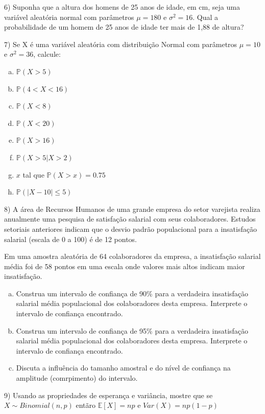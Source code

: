 \documentclass[12pt]{article}
\begin{document}
\vspace{3px}

6) Suponha que a altura dos homens de 25 anos de idade, em cm, seja uma variável aleatória normal com parâmetros $\mu = 180$ e $\sigma^2=16$. 
Qual a probabilidade de um homem de 25 anos de idade ter mais de 1,88 de altura?

\vspace{3px}

7) Se X é uma variável aleatória com distribuição Normal com parâmetros $\mu=10$ e $\sigma^2=36$, calcule:

\begin{enumerate}[a)]
    \item $\mathds{P}(X>5)$
    \item $\mathds{P}(4<X<16)$
    \item $\mathds{P}(X<8)$
    \item $\mathds{P}(X<20)$
    \item $\mathds{P}(X>16)$
    \item $\mathds{P}(X>5 | X> 2)$
    \item $x$ tal que $\mathds{P}(X>x) = 0.75$
    \item $\mathds{P}(|X-10| \leq 5)$
\end{enumerate}

\vspace{3px}


8) 
A área de Recursos Humanos de uma grande empresa do setor varejista realiza anualmente uma pesquisa de satisfação salarial
 com seus colaboradores. Estudos setoriais anteriores indicam que o desvio padrão populacional para a insatisfação salarial
(escala de 0 a 100) é de 12 pontos.

Em uma amostra aleatória de 64 colaboradores da empresa, 
a insatisfação salarial média foi de 58 pontos em uma escala onde valores mais altos indicam maior insatisfação.

\begin{enumerate}[a)]
    \item Construa um intervalo de confiança de 90\% para a verdadeira insatisfação salarial média populacional dos colaboradores desta empresa. Interprete o intervalo de confiança encontrado.
    \item Construa um intervalo de confiança de 95\% para a verdadeira insatisfação salarial média populacional dos colaboradores desta empresa. Interprete o intervalo de confiança encontrado.
    \item Discuta a influência do tamanho amostral e do nível de confiança na amplitude (comrpimento) do intervalo. 
\end{enumerate}

\vspace{3px}

9) Usando as propriedades de esperança e variância, mostre que se $X\sim Binomial(n,p)$ entãro $\mathds{E}[X] = np$ e $Var(X) = np(1-p)$
\end{document}
